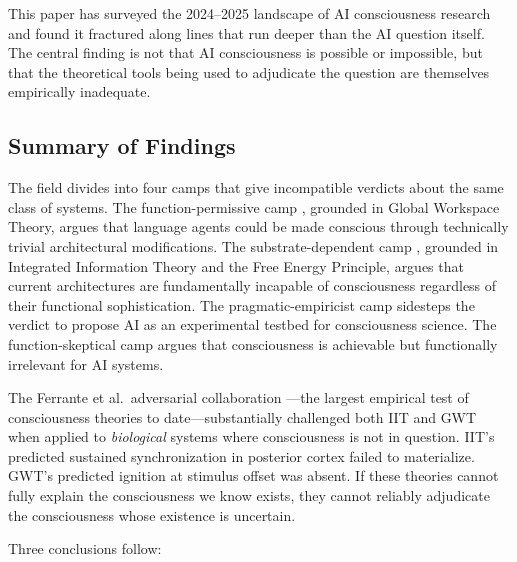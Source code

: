 
This paper has surveyed the 2024--2025 landscape of AI consciousness research and found
it fractured along lines that run deeper than the AI question itself. The central finding
is not that AI consciousness is possible or impossible, but that the theoretical tools being
used to adjudicate the question are themselves empirically inadequate.

\subsection{Summary of Findings}

The field divides into four camps that give incompatible verdicts about the same class of
systems. The function-permissive camp \cite{goldstein2024case}, grounded in Global Workspace
Theory, argues that language agents could be made conscious through technically trivial
architectural modifications. The substrate-dependent camp \cite{shin2025iit,wiese2024fep},
grounded in Integrated Information Theory and the Free Energy Principle, argues that current
architectures are fundamentally incapable of consciousness regardless of their functional
sophistication. The pragmatic-empiricist camp \cite{dror2025dual} sidesteps the verdict
to propose AI as an experimental testbed for consciousness science. The function-skeptical
camp \cite{sritriratanarak2025consciousness} argues that consciousness is achievable but
functionally irrelevant for AI systems.

The Ferrante et al.\ adversarial collaboration \cite{ferrante2025adversarial}---the largest
empirical test of consciousness theories to date---substantially challenged both IIT and GWT
when applied to \textit{biological} systems where consciousness is not in question. IIT's
predicted sustained synchronization in posterior cortex failed to materialize. GWT's predicted
ignition at stimulus offset was absent. If these theories cannot fully explain the
consciousness we know exists, they cannot reliably adjudicate the consciousness whose
existence is uncertain.

Three conclusions follow:

